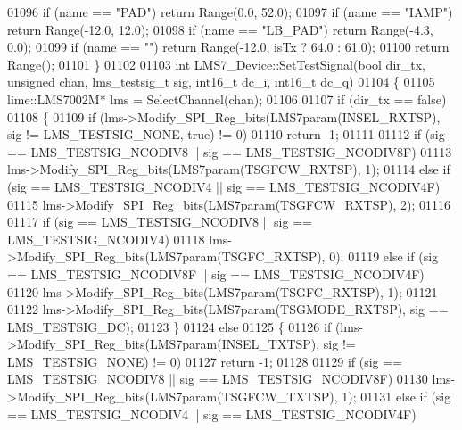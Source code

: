 \begin{DoxyCode}
{{{01096     \textcolor{keywordflow}{if} (name == \textcolor{stringliteral}{"PAD"}) \textcolor{keywordflow}{return} Range(0.0, 52.0);
01097     \textcolor{keywordflow}{if} (name == \textcolor{stringliteral}{"IAMP"}) \textcolor{keywordflow}{return} Range(-12.0, 12.0);
01098     \textcolor{keywordflow}{if} (name == \textcolor{stringliteral}{"LB\_PAD"}) \textcolor{keywordflow}{return} Range(-4.3, 0.0);
01099     \textcolor{keywordflow}{if} (name == \textcolor{stringliteral}{""}) \textcolor{keywordflow}{return} Range(-12.0, isTx ? 64.0 : 61.0);
01100     \textcolor{keywordflow}{return} Range();
01101 \}
01102 
01103 \textcolor{keywordtype}{int} LMS7_Device::SetTestSignal(\textcolor{keywordtype}{bool} dir_tx, \textcolor{keywordtype}{unsigned} chan, lms_testsig_t sig, int16\_t 
      dc_i, int16\_t dc_q)
01104 \{
01105     lime::LMS7002M* lms = SelectChannel(chan);
01106 
01107     \textcolor{keywordflow}{if} (dir\_tx == \textcolor{keyword}{false})
01108     \{
01109         \textcolor{keywordflow}{if} (lms->Modify_SPI_Reg_bits(LMS7param(INSEL_RXTSP), sig != 
      LMS_TESTSIG_NONE, \textcolor{keyword}{true}) != 0)
01110             \textcolor{keywordflow}{return} -1;
01111 
01112         \textcolor{keywordflow}{if} (sig == LMS_TESTSIG_NCODIV8 || sig == LMS_TESTSIG_NCODIV8F)
01113             lms->Modify_SPI_Reg_bits(LMS7param(TSGFCW_RXTSP), 1);
01114         \textcolor{keywordflow}{else} \textcolor{keywordflow}{if} (sig == LMS_TESTSIG_NCODIV4 || sig == LMS_TESTSIG_NCODIV4F)
01115             lms->Modify_SPI_Reg_bits(LMS7param(TSGFCW_RXTSP), 2);
01116 
01117         \textcolor{keywordflow}{if} (sig == LMS_TESTSIG_NCODIV8 || sig == LMS_TESTSIG_NCODIV4)
01118             lms->Modify_SPI_Reg_bits(LMS7param(TSGFC_RXTSP), 0);
01119         \textcolor{keywordflow}{else} \textcolor{keywordflow}{if} (sig == LMS_TESTSIG_NCODIV8F || sig == LMS_TESTSIG_NCODIV4F)
01120             lms->Modify_SPI_Reg_bits(LMS7param(TSGFC_RXTSP), 1);
01121 
01122         lms->Modify_SPI_Reg_bits(LMS7param(TSGMODE_RXTSP), sig == LMS_TESTSIG_DC);
01123     \}
01124     \textcolor{keywordflow}{else}
01125     \{
01126         \textcolor{keywordflow}{if} (lms->Modify_SPI_Reg_bits(LMS7param(INSEL_TXTSP), sig != 
      LMS_TESTSIG_NONE) != 0)
01127             \textcolor{keywordflow}{return} -1;
01128 
01129         \textcolor{keywordflow}{if} (sig == LMS_TESTSIG_NCODIV8 || sig == LMS_TESTSIG_NCODIV8F)
01130             lms->Modify_SPI_Reg_bits(LMS7param(TSGFCW_TXTSP), 1);
01131         \textcolor{keywordflow}{else} \textcolor{keywordflow}{if} (sig == LMS_TESTSIG_NCODIV4 || sig == LMS_TESTSIG_NCODIV4F)
}}}
\end{DoxyCode}
